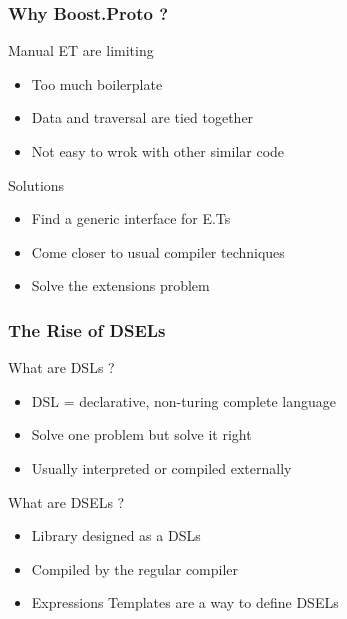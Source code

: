
\begin{frame}
\frametitle{Why Boost.Proto ?}
\begin{block}{Manual ET are limiting}
\begin{itemize}
\item Too much boilerplate
\item Data and traversal are tied together
\item Not easy to wrok with other similar code
\end{itemize}
\end{block}{}

\begin{block}{Solutions}
\begin{itemize}
\item Find a generic interface for E.Ts
\item Come closer to usual compiler techniques
\item Solve the extensions problem
\end{itemize}
\end{block}{}

\end{frame}

\begin{frame}
\frametitle{The Rise of DSELs}
\begin{block}{What are DSLs ?}
\begin{itemize}
\item DSL = declarative, non-turing complete language
\item Solve one problem but solve it right
\item Usually interpreted or compiled externally
\end{itemize}
\end{block}{}

\begin{block}{What are DSELs ?}
\begin{itemize}
\item Library designed as a DSLs
\item Compiled by the regular compiler
\item Expressions Templates are a way to define DSELs
\end{itemize}
\end{block}{}

\end{frame}

